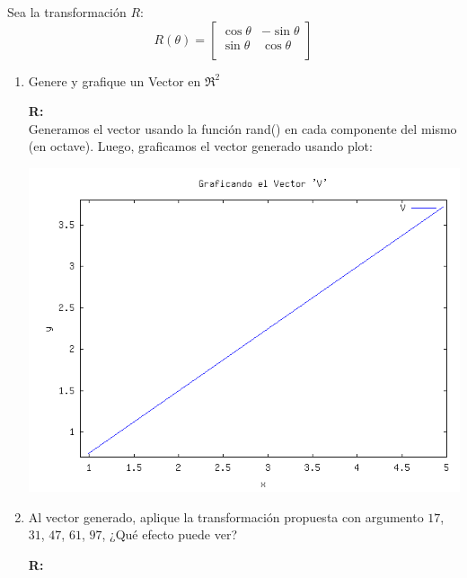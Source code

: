 	Sea la transformación $R$:
	\[
	R(\theta) = \begin{bmatrix} \cos \theta & -\sin \theta \\[3pt] \sin \theta & \cos \theta \\ \end{bmatrix}
	\]

\begin{enumerate}
	\item Genere y grafique un Vector en $\Re^2$

		\textbf{R:}\\

		Generamos el vector usando la función rand() en cada componente del mismo (en octave).
		Luego, graficamos el vector generado usando plot:

		\includegraphics[scale=0.6]{imagenes/3_v.png}
	\newpage
	\item Al vector generado, aplique la transformación propuesta con argumento $17$, $31$, $47$,
		$61$, $97$, ¿Qué efecto puede ver?

		\textbf{R:}\\
	

\end{enumerate}
